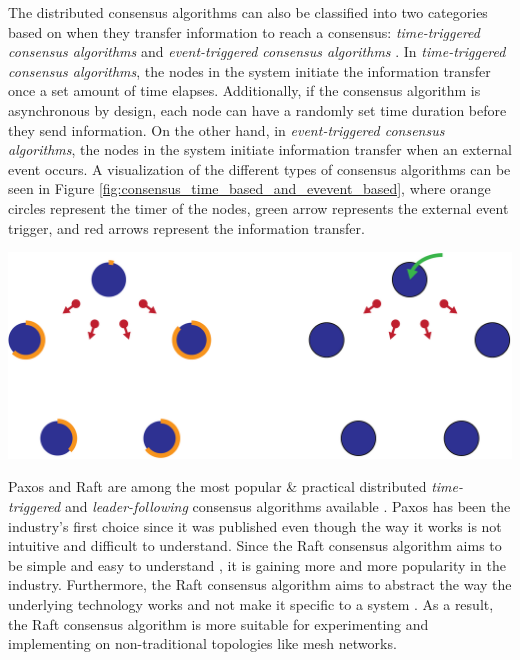 The distributed consensus algorithms can also be classified into two categories based on when they transfer information to reach a consensus: \emph{time-triggered consensus algorithms} and \emph{event-triggered consensus algorithms} \cite{consensus_systems_survey}. In \emph{time-triggered consensus algorithms}, the nodes in the system initiate the information transfer once a set amount of time elapses. Additionally, if the consensus algorithm is asynchronous by design, each node can have a randomly set time duration before they send information. On the other hand, in \emph{event-triggered consensus algorithms}, the nodes in the system initiate information transfer when an external event occurs. A visualization of the different types of consensus algorithms can be seen in Figure \ref{fig:consensus_time_based_and_evevent_based}, where orange circles represent the timer of the nodes, green arrow represents the external event trigger, and red arrows represent the information transfer.

\begingroup
    \centering
    \medskip
    \includegraphics[width=0.45\columnwidth]{final-proposal/images/consensus_time_based_and_evevent_based.png}
    \label{fig:consensus_time_based_and_evevent_based}
\endgroup

Paxos and Raft are among the most popular \& practical distributed \emph{time-triggered} and \emph{leader-following} consensus algorithms available \cite{paxos_vs_raft}. Paxos has been the industry's first choice since it was published even though the way it works is not intuitive and difficult to understand. Since the Raft consensus algorithm aims to be simple and easy to understand \cite{raft_paper}, it is gaining more and more popularity in the industry. Furthermore, the Raft consensus algorithm aims to abstract the way the underlying technology works and not make it specific to a system \cite{paxos_vs_raft}. As a result, the Raft consensus algorithm is more suitable for experimenting and implementing on non-traditional topologies like mesh networks.

